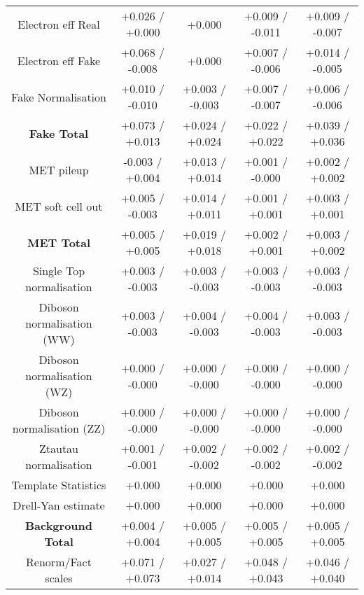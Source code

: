 \begin{table}[htbp]
\begin{center}
\begin{tabular}{|c|c|c|c|c|}
Electron eff Real                     &+0.026   / +0.000   & +0.000              & +0.009   / -0.011   & +0.009   / -0.007  \\
Electron eff Fake                     &+0.068   / -0.008   & +0.000              & +0.007   / -0.006   & +0.014   / -0.005  \\
Fake Normalisation                    &+0.010   / -0.010   & +0.003   / -0.003   & +0.007   / -0.007   & +0.006   / -0.006  \\
\hline
\textbf{Fake Total}                   &+0.073   / +0.013   & +0.024   / +0.024   & +0.022   / +0.022   & +0.039   / +0.036  \\
\hline
MET pileup                            &-0.003   / +0.004   & +0.013   / +0.014   & +0.001   / -0.000   & +0.002   / +0.002  \\
MET soft cell out                     &+0.005   / -0.003   & +0.014   / +0.011   & +0.001   / +0.001   & +0.003   / +0.001  \\
\hline
\textbf{MET Total}                    &+0.005   / +0.005   & +0.019   / +0.018   & +0.002   / +0.001   & +0.003   / +0.002  \\
\hline
Single Top normalisation              &+0.003   / -0.003   & +0.003   / -0.003   & +0.003   / -0.003   & +0.003   / -0.003  \\
Diboson normalisation (WW)            &+0.003   / -0.003   & +0.004   / -0.003   & +0.004   / -0.003   & +0.003   / -0.003  \\
Diboson normalisation (WZ)            &+0.000   / -0.000   & +0.000   / -0.000   & +0.000   / -0.000   & +0.000   / -0.000  \\
Diboson normalisation (ZZ)            &+0.000   / -0.000   & +0.000   / -0.000   & +0.000   / -0.000   & +0.000   / -0.000  \\
Ztautau normalisation                 &+0.001   / -0.001   & +0.002   / -0.002   & +0.002   / -0.002   & +0.002   / -0.002  \\
Template Statistics                   &+0.000              & +0.000              & +0.000              & +0.000             \\
Drell-Yan estimate                    &+0.000              & +0.000              & +0.000              & +0.000             \\
\hline
\textbf{Background Total}             &+0.004   / +0.004   & +0.005   / +0.005   & +0.005   / +0.005   & +0.005   / +0.005  \\
\hline
Renorm/Fact scales                    &+0.071   / +0.073   & +0.027   / +0.014   & +0.048   / +0.043   & +0.046   / +0.040  \\

\end{tabular}
\end{center}
\end{table}
